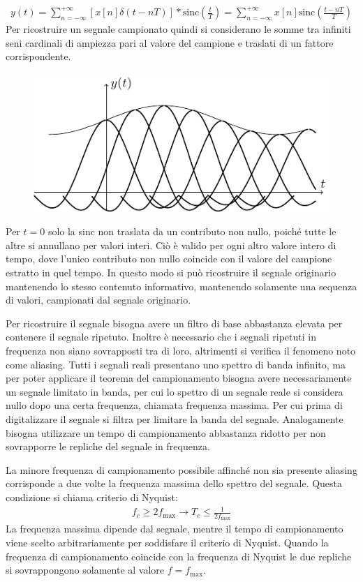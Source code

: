 \documentclass{article}
\newcommand{\sinc}{\mathrm{sinc}}
\numberwithin{equation}{subsection}
\begin{document}
\begin{gather*}
    y(t)=\displaystyle\sum_{n=-\infty}^{+\infty}\left[x[n]\delta(t-nT)\right]*\sinc\left(\frac{t}{T}\right)=\sum_{n=-\infty}^{+\infty}x[n]\sinc\left(\frac{t-nT}{T}\right)
\end{gather*}
Per ricostruire un segnale campionato quindi si considerano le somme tra infiniti seni cardinali di ampiezza pari al valore del campione e traslati di un fattore corrispondente. 
\begin{figure}[H]%
    \centering
    \includegraphics{segnale-ricostruito.pdf}
\end{figure}

Per $t=0$ solo la sinc non traslata da un contributo non nullo, poiché tutte le altre si annullano per valori interi. Ciò è valido per ogni altro valore intero di tempo, dove 
l'unico contributo non nullo coincide con il valore del campione estratto in quel tempo. In questo modo si può ricostruire il segnale originario mantenendo lo stesso contenuto 
informativo, mantenendo solamente una sequenza di valori, campionati dal segnale originario. 


Per ricostruire il segnale bisogna avere un filtro di base abbastanza elevata per contenere il segnale ripetuto. Inoltre è necessario che i segnali ripetuti in frequenza non siano 
sovrapposti tra di loro, altrimenti si verifica il fenomeno noto come aliasing. 
Tutti i segnali reali presentano uno spettro di banda infinito, ma per poter applicare il teorema del campionamento bisogna avere necessariamente un segnale limitato in banda, 
per cui lo spettro di un segnale reale si considera nullo dopo una certa frequenza, chiamata frequenza massima. Per cui prima di digitalizzare il segnale si filtra per 
limitare la banda del segnale. Analogamente bisogna utilizzare un tempo di campionamento abbastanza ridotto per non sovrapporre le repliche del segnale in frequenza. 

La minore frequenza di campionamento possibile affinché non sia presente aliasing corrisponde a due volte la frequenza massima dello spettro del segnale. Questa condizione 
si chiama criterio di Nyquist:
\begin{gather}
    f_c\geq 2f_{\max}\to T_c\leq \displaystyle\frac{1}{2f_{\max}}
\end{gather}
La frequenza massima dipende dal segnale, mentre il tempo di campionamento viene scelto arbitrariamente per soddisfare il criterio di Nyquist. Quando la frequenza di campionamento 
coincide con la frequenza di Nyquist le due repliche si sovrappongono solamente al valore $f=f_{\max}$. 
\end{document}
